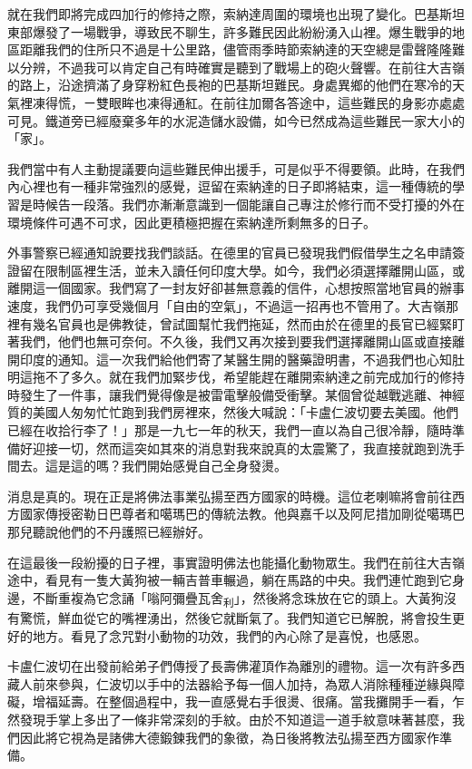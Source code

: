 就在我們即將完成四加行的修持之際，索納達周圍的環境也出現了變化。巴基斯坦東部爆發了一場戰爭，導致民不聊生，許多難民因此紛紛湧入山裡。爆生戰爭的地區距離我們的住所只不過是十公里路，儘管雨季時節索納達的天空總是雷聲隆隆難以分辨，不過我可以肯定自己有時確實是聽到了戰場上的砲火聲響。在前往大吉嶺的路上，沿途擠滿了身穿粉紅色長袍的巴基斯坦難民。身處異鄉的他們在寒冷的天氣裡凍得慌，ㄧ雙眼眸也凍得通紅。在前往加爾各答途中，這些難民的身影亦處處可見。鐵道旁已經廢棄多年的水泥造儲水設備，如今已然成為這些難民一家大小的「家」。

我們當中有人主動提議要向這些難民伸出援手，可是似乎不得要領。此時，在我們內心裡也有一種非常強烈的感覺，逗留在索納達的日子即將結束，這一種傳統的學習是時候告一段落。我們亦漸漸意識到一個能讓自己專注於修行而不受打擾的外在環境條件可遇不可求，因此更積極把握在索納達所剩無多的日子。

外事警察已經通知說要找我們談話。在德里的官員已發現我們假借學生之名申請簽證留在限制區裡生活，並未入讀任何印度大學。如今，我們必須選擇離開山區，或離開這一個國家。我們寫了一封友好卻甚無意義的信件，心想按照當地官員的辦事速度，我們仍可享受幾個月「自由的空氣」，不過這一招再也不管用了。大吉嶺那裡有幾名官員也是佛教徒，曾試圖幫忙我們拖延，然而由於在德里的長官已經緊盯著我們，他們也無可奈何。不久後，我們又再次接到要我們選擇離開山區或直接離開印度的通知。這一次我們給他們寄了某醫生開的醫藥證明書，不過我們也心知肚明這拖不了多久。就在我們加緊步伐，希望能趕在離開索納達之前完成加行的修持時發生了一件事，讓我們覺得像是被雷電擊般備受衝擊。某個曾從越戰逃離、神經質的美國人匆匆忙忙跑到我們房裡來，然後大喊說：「卡盧仁波切要去美國。他們已經在收拾行李了！」那是一九七一年的秋天，我們一直以為自己很冷靜，隨時準備好迎接一切，然而這突如其來的消息對我來說真的太震驚了，我直接就跑到洗手間去。這是這的嗎？我們開始感覺自己全身發燙。

消息是真的。現在正是將佛法事業弘揚至西方國家的時機。這位老喇嘛將會前往西方國家傳授密勒日巴尊者和噶瑪巴的傳統法教。他與嘉千以及阿尼措加剛從噶瑪巴那兒聽說他們的不丹護照已經辦好。

在這最後一段紛擾的日子裡，事實證明佛法也能攝化動物眾生。我們在前往大吉嶺途中，看見有一隻大黃狗被一輛吉普車輾過，躺在馬路的中央。我們連忙跑到它身邊，不斷重複為它念誦「嗡阿彌疊瓦舍\textsubscript{利}」，然後將念珠放在它的頭上。大黃狗沒有驚慌，鮮血從它的嘴裡湧出，然後它就斷氣了。我們知道它已解脫，將會投生更好的地方。看見了念咒對小動物的功效，我們的內心除了是喜悅，也感恩。

卡盧仁波切在出發前給弟子們傳授了長壽佛灌頂作為離別的禮物。這一次有許多西藏人前來參與，仁波切以手中的法器給予每一個人加持，為眾人消除種種逆緣與障礙，增福延壽。在整個過程中，我一直感覺右手很燙、很痛。當我攤開手一看，乍然發現手掌上多出了一條非常深刻的手紋。由於不知道這一道手紋意味著甚麼，我們因此將它視為是諸佛大德鍛鍊我們的象徵，為日後將教法弘揚至西方國家作準備。

